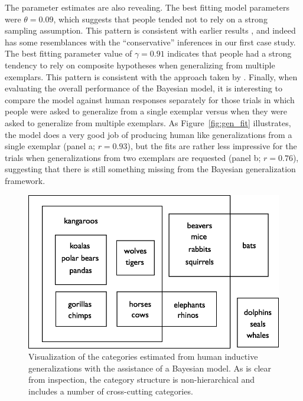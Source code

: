 The parameter estimates are also revealing. The best fitting model parameters were $\theta=0.09$, which suggests that people tended not to rely on a strong sampling assumption. This pattern is consistent with earlier results \cite{navarro2012,RansomINPRESS}, and indeed has some resemblances with the ``conservative'' inferences in our first case study. The best fitting parameter value of $\gamma=0.91$ indicates that people had a strong tendency to rely on composite hypotheses when generalizing from multiple exemplars. This pattern is consistent with the approach taken by . Finally, when evaluating the overall performance of the Bayesian model, it is interesting to compare the model against human responses separately for those trials in which people were asked to generalize from a single exemplar versus when they were asked to generalize from multiple exemplars. As Figure~\ref{fig:gen_fit} illustrates, the model does a very good job of producing human like generalizations from a single exemplar (panel a; $r=0.93$), but the fits are rather less impressive for the trials when generalizations from two exemplars are requested (panel b; $r=0.76$), suggesting that there is still something missing from the Bayesian generalization framework. 






\begin{figure}[p]
\begin{center}
\bigskip
\includegraphics[width=.6\textwidth]{generalization_figs/hypotheses.png}
\bigskip
\caption{Visualization of the categories estimated from human inductive generalizations with the assistance of a Bayesian model. As is clear from inspection, the category structure is non-hierarchical and includes a number of cross-cutting categories.}
\label{fig:hypothesis_space}
\end{center}
\end{figure}


